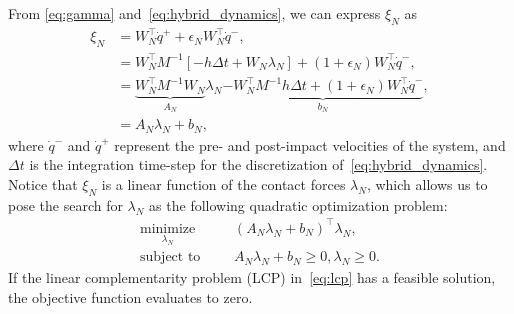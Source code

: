 From \eqref{eq:gamma} and~\eqref{eq:hybrid_dynamics}, we can express $\xi_N$
as 
\begin{align*}
  \xi_N &= W_N^\top \dot{q}^+ + \epsilon_N W_N^\top \dot{q}^-, \\
  &= W_N^\top M^{-1}[-h \Delta t + W_N \lambda_N] + (1 + \epsilon_N)W_N^\top \dot{q}^-, \\
  &= \underbrace{W_N^\top M^{-1}W_N}_{A_N} \lambda_N \underbrace{-W_N^\top M^{-1}h \Delta t + (1 + \epsilon_N) W_N^\top \dot{q}^-}_{b_N}, \\
  &= A_N \lambda_N + b_N,
\end{align*}
\noindent where $\dot{q}^-$ and $\dot{q}^+$ represent the pre- and post-impact
velocities of the system, and $\Delta t$ is the integration time-step for the
discretization of~\eqref{eq:hybrid_dynamics}.
%
Notice that $\xi_N$ is a linear function of the contact forces $\lambda_N$,
which allows us to pose the search for $\lambda_N$ as the following quadratic
optimization problem:
\begin{equation}
  \begin{aligned}
      \underset{\lambda_N}{\textrm{minimize}} 
      & & &(A_N \lambda_N + b_N)^\top \lambda_N, \\%
      \textrm{subject to}
      & & &A_N \lambda_N + b_N \geq 0, \lambda_N \geq 0.
  \end{aligned}
  \label{eq:lcp}
\end{equation}
\noindent If the linear complementarity problem (LCP) in~\eqref{eq:lcp} has a
feasible solution, the objective function evaluates to zero.


